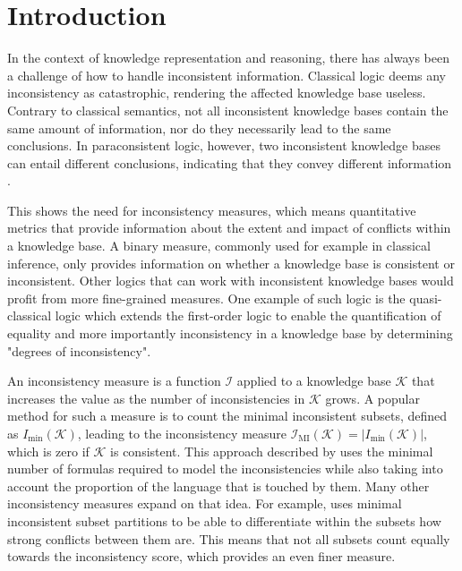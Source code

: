 \section{Introduction}
In the context of knowledge representation and reasoning, there has always been a challenge of how to handle inconsistent information. Classical logic deems any inconsistency as catastrophic, rendering the affected knowledge base useless. Contrary to classical semantics, not all inconsistent knowledge bases contain the same amount of information, nor do they necessarily lead to the same conclusions. In paraconsistent logic, however, two inconsistent knowledge bases can entail different conclusions, indicating that they convey different information \cite{bertossi_approaches_2005}.

This shows the need for inconsistency measures, which means quantitative metrics that provide information about the extent and impact of conflicts within a knowledge base. A binary measure, commonly used for example in classical inference, only provides information on whether a knowledge base is consistent or inconsistent. Other logics that can work with inconsistent knowledge bases would profit from more fine-grained measures. One example of such logic is the quasi-classical logic \cite{grant_measuring_2006} which extends the first-order logic to enable the quantification of equality and more importantly inconsistency in a knowledge base by determining "degrees of inconsistency".

An inconsistency measure is a function \(\mathcal{I}\) applied to a knowledge base \(\mathcal{K}\) that increases the value as the number of inconsistencies in \(\mathcal{K}\) grows. A popular method for such a measure is to count the minimal inconsistent subsets, defined as \(I_{\min}(\mathcal{K})\), leading to the inconsistency measure \(\mathcal{I}_{\text{MI}}(\mathcal{K}) = \left| I_{\min}(\mathcal{K}) \right|\), which is zero if \(\mathcal{K}\) is consistent. This approach described by \cite{hunter_measuring_2008} uses the minimal number of formulas required to model the inconsistencies while also taking into account the proportion of the language that is touched by them. Many other inconsistency measures expand on that idea. For example, \cite{jabbour_mis_2016} uses minimal inconsistent subset partitions to be able to differentiate within the subsets how strong conflicts between them are. This means that not all subsets count equally towards the inconsistency score, which provides an even finer measure.

